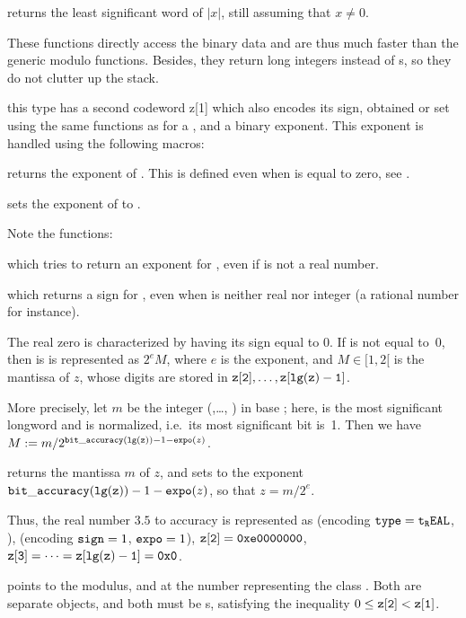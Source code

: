  returns the least significant word of $|x|$, still
assuming that $x\neq 0$.

These functions directly access the binary data and are thus much faster than
the generic modulo functions. Besides, they return long integers instead of
s, so they do not clutter up the stack.

this type has a second codeword z[1] which
also encodes its sign, obtained or set using the same functions as for a
, and a binary exponent. This exponent is handled using the
following macros:

 returns the exponent of .
This is defined even when  is equal to zero, see
.

 sets the exponent of  to .

\noindent Note the functions:

 which tries to return an exponent for ,
even if  is not a real number.

 which returns a sign for , even when
 is neither real nor integer (a rational number for instance).

The real zero is characterized by having its sign equal to 0. If  is
not equal to~0, then is is represented as $2^e M$, where $e$ is the exponent,
and $M\in [1, 2[$ is the mantissa of $z$, whose digits are stored in
${\tt z[2]},\dots, {\tt z[lg(z)-1]}$.

More precisely, let $m$ be the integer (,\dots, )
in base ; here,  is the most significant
longword and is normalized, i.e.~its most significant bit is~1. Then we have
$M := m / 2^{{\tt bit\_accuracy(lg(z))} - 1 - {\tt expo}(z)}$.

 returns the mantissa $m$ of $z$, and
sets  to the exponent ${\tt bit\_accuracy(lg(z))}-1-{\tt expo}(z)$,
so that $z = m / 2^e$.

Thus, the real number $3.5$ to accuracy  is
represented as  (encoding ${\tt type} = {\tt t_REAL}$, ),
 (encoding ${\tt sign} = 1$, ${\tt expo} = 1$), ${\tt z[2]} =
{\tt 0xe0000000}$, ${\tt z[3]} =\dots = {\tt z[lg(z)-1]} = {\tt 0x0}$.

 points to the modulus, and  at the number representing
the class . Both are separate  objects, and both must be
s, satisfying the inequality $0 \le {\tt z[2]} < {\tt z[1]}$.

